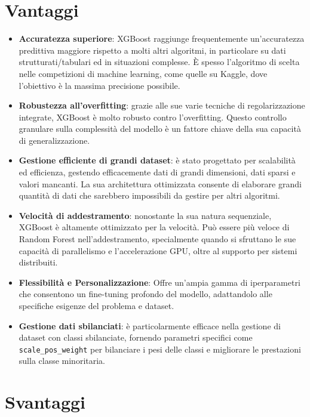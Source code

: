 \documentclass[a4paper,12pt]{report}
\begin{document}
	\section{Vantaggi}
	
	\begin{itemize}
		\item \textbf{Accuratezza superiore}: XGBoost raggiunge frequentemente un'accuratezza predittiva maggiore rispetto a molti altri algoritmi, in particolare su dati strutturati/tabulari ed in situazioni complesse. È spesso l'algoritmo di scelta nelle competizioni di machine learning, come quelle su Kaggle, dove l'obiettivo è la massima precisione possibile.
		\item \textbf{Robustezza all'overfitting}: grazie alle sue varie tecniche di regolarizzazione integrate, XGBoost è molto robusto contro l'overfitting. Questo controllo granulare sulla complessità del modello è un fattore chiave della sua capacità di generalizzazione.
		\item \textbf{Gestione efficiente di grandi dataset}: è stato progettato per scalabilità ed efficienza, gestendo efficacemente dati di grandi dimensioni, dati sparsi e valori mancanti. La sua architettura ottimizzata consente di elaborare grandi quantità di dati che sarebbero impossibili da gestire per altri algoritmi.
		\item \textbf{Velocità di addestramento}: nonostante la sua natura sequenziale, XGBoost è altamente ottimizzato per la velocità. Può essere più veloce di Random Forest nell'addestramento, specialmente quando si sfruttano le sue capacità di parallelismo e l'accelerazione GPU, oltre al supporto per sistemi distribuiti.
		\item \textbf{Flessibilità e Personalizzazione}: Offre un'ampia gamma di iperparametri che consentono un fine-tuning profondo del modello, adattandolo alle specifiche esigenze del problema e dataset.
		\item \textbf{Gestione dati sbilanciati}: è particolarmente efficace nella gestione di dataset con classi sbilanciate, fornendo parametri specifici come \texttt{scale\_pos\_weight} per bilanciare i pesi delle classi e migliorare le prestazioni sulla classe minoritaria.
	\end{itemize}
	
	\section{Svantaggi}
	
\end{document}
